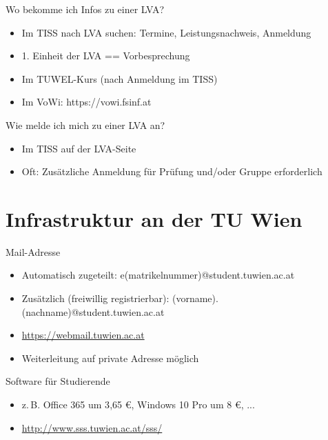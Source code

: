 \documentclass{beamer}
\begin{document}
\begin{frame}{Wo bekomme ich Infos zu einer LVA?}
    \begin{itemize}
        \item Im TISS nach LVA suchen: Termine, Leistungsnachweis, Anmeldung
        \item 1. Einheit der LVA == Vorbesprechung
        \item Im TUWEL-Kurs (nach Anmeldung im TISS)
        \item Im VoWi: https://vowi.fsinf.at
    \end{itemize}
\end{frame}

\begin{frame}{Wie melde ich mich zu einer LVA an?}
    \begin{itemize}
        \item Im TISS auf der LVA-Seite
        \item Oft: Zusätzliche Anmeldung für Prüfung und/oder Gruppe erforderlich
    \end{itemize}
\end{frame}

\section{Infrastruktur an der TU Wien}

\begin{frame}{Mail-Adresse}
    \begin{itemize}
        \item Automatisch zugeteilt: e(matrikelnummer)@student.tuwien.ac.at
        \item Zusätzlich (freiwillig registrierbar): (vorname).(nachname)@student.tuwien.ac.at
        \item \url{https://webmail.tuwien.ac.at}
        \item Weiterleitung auf private Adresse möglich
    \end{itemize}
\end{frame}

\begin{frame}{Software für Studierende}
    \begin{itemize}
        \item z.\,B. Office 365 um 3{,}65 €, Windows 10 Pro um 8 €, ...
        \item \url{http://www.sss.tuwien.ac.at/sss/}
    \end{itemize}
\end{frame}
\end{document}
